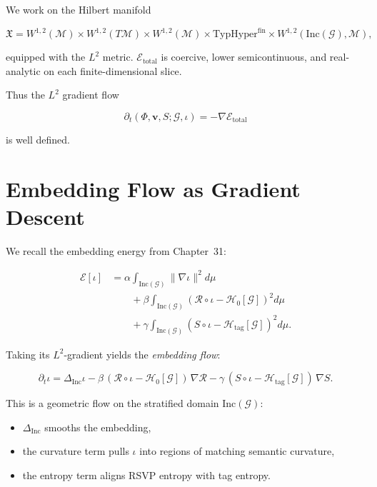 We work on the Hilbert manifold

\begin{equation}
\mathfrak{X}
 = 
  W^{1,2}(\mathcal{M})
  \times W^{1,2}(T\mathcal{M})
  \times W^{1,2}(\mathcal{M})
  \times \mathrm{TypHyper}^{\mathrm{fin}}
  \times W^{1,2}(\mathrm{Inc}(\mathcal{G}),\mathcal{M}),
\end{equation}

equipped with the $L^2$ metric.  
$\mathcal{E}_{\mathrm{total}}$ is coercive, lower semicontinuous, and
real-analytic on each finite-dimensional slice.

Thus the $L^2$ gradient flow

\begin{equation}
\partial_t(\Phi,\mathbf{v},S;\mathcal{G},\iota)
  = -\nabla \mathcal{E}_{\mathrm{total}}
\end{equation}

is well defined.

\section{Embedding Flow as Gradient Descent}

We recall the embedding energy from Chapter~31:

\begin{align}
\mathcal{E}[\iota]
  &=
  \alpha\!\int_{\mathrm{Inc}(\mathcal{G})}
     \lVert \nabla\iota\rVert^2 d\mu \\
  &\qquad + \beta\!\int_{\mathrm{Inc}(\mathcal{G})}
     (\mathcal{R}\circ\iota - \mathcal{H}_0[\mathcal{G}])^2 d\mu \\
  &\qquad + \gamma\!\int_{\mathrm{Inc}(\mathcal{G})}
     (S\circ\iota - \mathcal{H}_{\mathrm{tag}}[\mathcal{G}])^2 d\mu .
\end{align}

Taking its $L^2$-gradient yields the \emph{embedding flow}:

\begin{equation}
\label{eq:embedding-flow-main}
\partial_t\iota
  = \Delta_{\mathrm{Inc}}\iota
   - \beta\,(\mathcal{R}\circ\iota - \mathcal{H}_0[\mathcal{G}])\,\nabla\mathcal{R}
   - \gamma\,(S\circ\iota - \mathcal{H}_{\mathrm{tag}}[\mathcal{G}])\,\nabla S.
\end{equation}

This is a geometric flow on the stratified domain $\mathrm{Inc}(\mathcal{G})$:
\begin{itemize}
\item $\Delta_{\mathrm{Inc}}$ smooths the embedding,
\item the curvature term pulls $\iota$ into regions of matching semantic curvature,
\item the entropy term aligns RSVP entropy with tag entropy.
\end{itemize}

